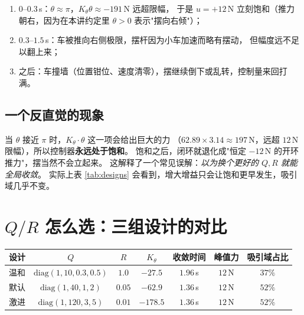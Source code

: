 \begin{enumerate}[leftmargin=2em,itemsep=2pt]
  \item $0$--$0.3$\,s：$\theta\approx\pi$，$K_\theta\theta\approx-191$\,N 远超限幅，
        于是 $u=+12$\,N 立刻饱和（推力朝右，因为在本讲约定里 $\theta>0$ 表示"摆向右倾"）；
  \item $0.3$--$1.5$\,s：车被推向右侧极限，摆杆因为小车加速而略有摆动，
        但幅度远不足以翻上来；
  \item 之后：车撞墙（位置钳位、速度清零），摆继续倒下或乱转，控制量来回打满。
\end{enumerate}


\subsection{一个反直觉的现象}

当 $\theta$ 接近 $\pi$ 时，$K_\theta\cdot\theta$ 这一项会给出巨大的力
（$62.89\times3.14\approx197$\,N，远超 $12$\,N 限幅），所以控制器\textbf{永远处于饱和}。
饱和之后，闭环就退化成"恒定 $-12$\,N 的开环推力"，摆当然不会立起来。
这解释了一个常见误解：\emph{以为换个更好的 $Q,R$ 就能全局收敛}。
实际上表 \ref{tab:designs} 会看到，增大增益只会让饱和更早发生，吸引域几乎不变。

\section{$Q/R$ 怎么选：三组设计的对比}

\begin{center}
\small
\begin{tabular}{@{}lcccccc@{}}
\toprule
设计 & $Q$ & $R$ & $K_\theta$ & 收敛时间 & 峰值力 & 吸引域占比 \\
\midrule
温和 & $\mathrm{diag}(1,10,0.3,0.5)$ & $1.0$ & $-27.5$ & $1.96$\,s & $12$\,N & $37\%$ \\
默认 & $\mathrm{diag}(1,40,1,2)$ & $0.05$ & $-62.9$ & $1.36$\,s & $12$\,N & $52\%$ \\
激进 & $\mathrm{diag}(1,120,3,5)$ & $0.01$ & $-178.5$ & $1.36$\,s & $12$\,N & $52\%$ \\
\bottomrule
\end{tabular}
\label{tab:designs}
\end{center}

